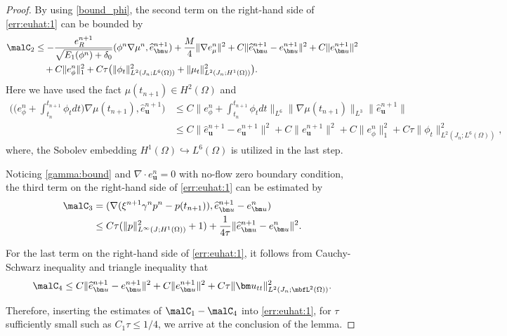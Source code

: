 \begin{proof}
	By using \eqref{bound_phi},  the second term  on the right-hand side of \eqref{err:euhat:1} can be bounded by
	\begin{equation*}  \label{err:chi2}
		\begin{aligned}
			{\malC}_2  
			& \leq   -\frac{e_R^{n+1}}{\sqrt{E_1(\phi^n)+\delta_0 } } ( \phi^n \nabla \mu^n ,\widehat e_{\bm u}^{n+1})  + \frac{M}{4}\|\nabla e_\mu^n\|^2 + C\|\widehat{e}_{\bm u}^{n+1}-e_{\bm u}^{n+1}\|^2 +C\|e_{\bm u}^{n+1}\|^2\\
			&  \quad   +C\|e_\phi^n\|_1^2+C\tau \big( \|\phi_t\|_{L^2(J_n ; L^6(\Omega))}^2+\|\mu_t\|_{L^2(J_n ; H^1(\Omega))}^2\big).
		\end{aligned}
	\end{equation*}
	Here we have used the fact $\mu(t_{n+1}) \in  H^2(\Omega)$ and
	\begin{equation*}
		\begin{aligned}
			\big( \big(e_\phi^n +\int_{t_n}^{t_{n+1}}\phi_t dt \big)\nabla \mu(t_{n+1}), \widehat e_{\bm u}^{n+1} \big)  
			&\le  C \|e_\phi^n + \int_{t_n}^{t_{n+1}} \phi_t dt\|_{L^6} \|\nabla \mu(t_{n+1})\|_{L^3} \|\widehat e_{\bm u}^{n+1}\|\\
			& \le   C\|\widehat{e}_{\bm u}^{n+1}-e_{\bm u}^{n+1}\|^2 +C\|e_{\bm u}^{n+1}\|^2 
			+C\|e_\phi^n\|_1^2  +C\tau  \|\phi_t\|_{L^2(J_n ; L^6(\Omega))}^2,
		\end{aligned}
	\end{equation*}
	where, the Sobolev embedding $H^1(\Omega) \hookrightarrow L^6(\Omega)$ is utilized in the last step.
	
	Noticing \eqref{gamma:bound} and $\nabla \cdot e_{\bm u}^{n} =0$ with no-flow zero boundary condition, the third term  on the right-hand side of \eqref{err:euhat:1} can be estimated by
	\begin{equation*}  
		\begin{aligned}
			{\malC}_3
			& = (\nabla(\xi^{n+1} \gamma^n  p^n-p(t_{n+1})),  \widehat{e}_{\bm u}^{n+1}-e_{\bm u}^n) \\
			& \leq C\tau(\|p\|_{L^{\infty}(J;  H^1(\Omega))}^2+1) 
			+ \frac{1}{4\tau}\|\widehat{e}_{\bm u}^{n+1}-e_{\bm u}^n\|^2.
		\end{aligned}
	\end{equation*}
	
	For the last term on the right-hand side of \eqref{err:euhat:1}, it follows from Cauchy-Schwarz inequality and triangle inequality that
	\begin{equation*}  
		{\malC}_4 \le C\|\widehat{e}_{\bm u}^{n+1}-e_{\bm u}^{n+1}\|^2 +C\|e_{\bm u}^{n+1}\|^2  +C\tau\| \bm u_{tt}\|_{L^2(J_n; \mbfL^2(\Omega))}^2.
	\end{equation*}
	
	Therefore, inserting the estimates of ${\malC}_1-{\malC}_4$ into \eqref{err:euhat:1}, for $\tau$ sufficiently small such as
	$C_1\tau \le 1/4$, we arrive at the conclusion of the lemma.
\end{proof}

